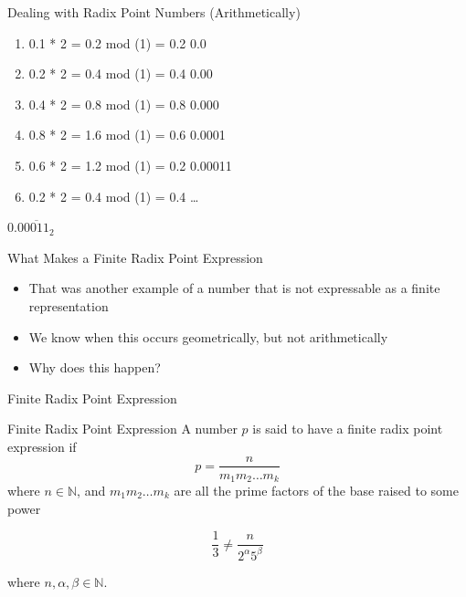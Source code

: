 \documentclass{beamer}
\begin{document}
\begin{frame}{Dealing with Radix Point Numbers (Arithmetically)}
  \begin{example}\pause
    \begin{enumerate}
      \item[] 0.1 * 2 = 0.2  mod (1) = 0.2 \hfill 0.0\pause
      \item[] 0.2 * 2 = 0.4  mod (1) = 0.4 \hfill 0.00\pause
      \item[] 0.4 * 2 = 0.8  mod (1) = 0.8 \hfill 0.000\pause
      \item[] 0.8 * 2 = 1.6  mod (1) = 0.6 \hfill 0.0001\pause
      \item[] 0.6 * 2 = 1.2  mod (1) = 0.2 \hfill 0.00011\pause
      \item[] 0.2 * 2 = 0.4  mod (1) = 0.4 \hfill\dots\pause
    \end{enumerate}
    \hfill $0.0\overline{0011}_2$
  \end{example}
\end{frame}

\begin{frame}{What Makes a Finite Radix Point Expression}
  \begin{itemize}
    \item That was another example of a number that is not expressable as a finite representation \pause
    \item We know when this occurs geometrically, but not arithmetically
    \item Why does this happen?
  \end{itemize}
\end{frame}

\begin{frame}{Finite Radix Point Expression}
  \begin{block}{Finite Radix Point Expression}
    A number $p$ is said to have a finite radix point expression if $$p=\frac{n}{m_1 m_2\dots m_k}$$ where $n\in\mathbb{N}$, and $m_1 m_2 \dots m_k$ are all the prime factors of the base raised to some power 
  \end{block}\pause

  \begin{example}[1/3 in Base 10]
    $$\frac{1}{3} \neq \frac{n}{2^\alpha 5^\beta}$$

    where $n,\alpha,\beta\in\mathbb{N}$.
  \end{example}
\end{frame}
\end{document}
